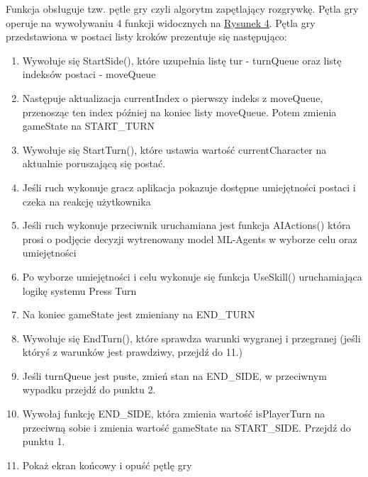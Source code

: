 \documentclass{SGGW-thesis}
\begin{document}
Funkcja obsługuje tzw. pętle gry czyli algorytm zapętlający rozgrywkę. Pętla gry operuje na wywoływaniu 4 funkcji widocznych na \hyperref[fig:UpdateBattle]{Rysunek 4}. Pętla gry przedstawiona w postaci listy kroków prezentuje się następująco:
\begin{enumerate}
  \item{Wywołuje się StartSide(), które uzupełnia listę tur - turnQueue oraz listę indeksów postaci - moveQueue}
  \item{Następuje aktualizacja currentIndex o pierwszy indeks z moveQueue, przenosząc ten index później na koniec listy moveQueue. Potem zmienia gameState na START\_TURN}
  \item{Wywołuje się StartTurn(), które ustawia wartość currentCharacter na aktualnie poruszającą się postać.}
  \item{Jeśli ruch wykonuje gracz aplikacja pokazuje dostępne umiejętności postaci i czeka na reakcję użytkownika}
  \item{Jeśli ruch wykonuje przeciwnik uruchamiana jest funkcja AIActions() która prosi o podjęcie decyzji wytrenowany model ML-Agents w wyborze celu oraz umiejętności}
  \item{Po wyborze umiejętności i celu wykonuje się funkcja UseSkill() uruchamiająca logikę systemu Press Turn}
  \item{Na koniec gameState jest zmieniany na END\_TURN}
  \item{Wywołuje się EndTurn(), które sprawdza warunki wygranej i przegranej (jeśli któryś z warunków jest prawdziwy, przejdź do 11.)}
  \item{Jeśli turnQueue jest puste, zmień stan na END\_SIDE, w przeciwnym wypadku przejdź do punktu 2.}
  \item{Wywołaj funkcję END\_SIDE, która zmienia wartość isPlayerTurn na przeciwną sobie i zmienia wartość gameState na START\_SIDE. Przejdź do punktu 1.}
  \item{Pokaż ekran końcowy i opuść pętlę gry}
\end{enumerate}
\end{document}

